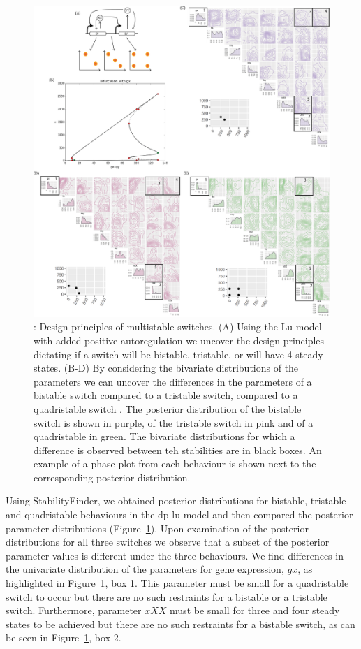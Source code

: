 \begin{figure}
	\begin{center}
		\includegraphics[width=\textwidth]{../../chapters/chapterStabilityFinder/images/Lu_234.png}
		\caption[LoF caption]{ \label{fig:lu_234}: Design principles of multistable switches. (A) Using the Lu model with added positive autoregulation we uncover the design principles dictating if a switch will be bistable, tristable, or will have 4 steady states. (B-D) By considering the bivariate distributions of the parameters we can uncover the differences in the parameters of a bistable switch compared to a tristable switch, compared to a quadristable switch . The posterior distribution of the bistable switch is shown in purple, of the tristable switch in pink and of a quadristable in green. The bivariate distributions for which a difference is observed between teh stabilities are in black boxes. An example of a phase plot from each behaviour is shown next to the corresponding posterior distribution.}
	\end{center}
\end{figure}



 Using StabilityFinder, we obtained posterior distributions for bistable, tristable and quadristable behaviours in the \acrshort{dp-lu} model and then compared the posterior parameter distributions (Figure~\ref{fig:lu_234}). Upon examination of the posterior distributions for all three switches we observe that a subset of the posterior parameter values is different under the three behaviours. We find differences in the univariate distribution of the parameters for gene expression, $gx$, as highlighted in Figure~\ref{fig:lu_234}, box 1. This parameter must be small for a quadristable switch to occur but there are no such restraints for a bistable or a tristable switch. Furthermore, parameter $xXX$ must be small for three and four steady states to be achieved but there are no such restraints for a bistable switch, as can be seen in Figure~\ref{fig:lu_234}, box 2. 

